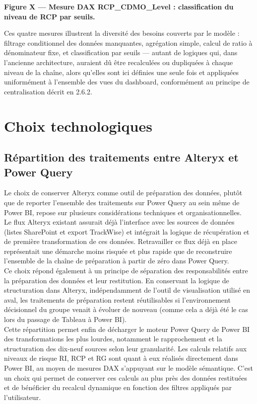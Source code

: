 \textbf{Figure X — Mesure DAX RCP\_CDMO\_Level : classification du niveau de RCP par seuils.}

Ces quatre mesures illustrent la diversité des besoins couverts par le modèle : filtrage 
conditionnel des données manquantes, agrégation simple, calcul de ratio à dénominateur 
fixe, et classification par seuils — autant de logiques qui, dans l'ancienne architecture, 
auraient dû être recalculées ou dupliquées à chaque niveau de la chaîne, alors qu'elles sont 
ici définies une seule fois et appliquées uniformément à l'ensemble des vues du dashboard, 
conformément au principe de centralisation décrit en 2.6.2.

\section{Choix technologiques}
\subsection{Répartition des traitements entre Alteryx et Power Query}
Le choix de conserver Alteryx comme outil de préparation des données, plutôt que de 
reporter l'ensemble des traitements sur Power Query au sein même de Power BI, repose sur 
plusieurs considérations techniques et organisationnelles.
\\

Le flux Alteryx existant assurait déjà l'interface avec les sources de données (listes 
SharePoint et export TrackWise) et intégrait la logique de récupération et de première 
transformation de ces données. Retravailler ce flux déjà en place représentait une démarche 
moins risquée et plus rapide que de reconstruire l'ensemble de la chaîne de préparation à 
partir de zéro dans Power Query.\\

Ce choix répond également à un principe de séparation des responsabilités entre la 
préparation des données et leur restitution. En conservant la logique de structuration dans 
Alteryx, indépendamment de l'outil de visualisation utilisé en aval, les traitements de 
préparation restent réutilisables si l'environnement décisionnel du groupe venait à évoluer de 
nouveau (comme cela a déjà été le cas lors du passage de Tableau à Power BI). \\

Cette répartition permet enfin de décharger le moteur Power Query de Power BI des 
transformations les plus lourdes, notamment le rapprochement et la structuration des dix-neuf 
sources selon leur granularité. Les calculs relatifs aux niveaux de risque RI, RCP et RG sont 
quant à eux réalisés directement dans Power BI, au moyen de mesures DAX s'appuyant sur 
le modèle sémantique. C’est un choix qui permet de conserver ces calculs au plus près des 
données restituées et de bénéficier du recalcul dynamique en fonction des filtres appliqués 
par l'utilisateur.

